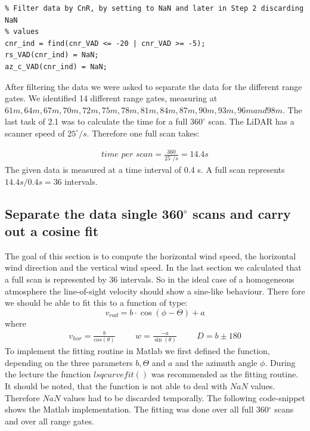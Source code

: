 \documentclass[10pt]{article}
\begin{document}
\begin{lstlisting}
% Filter data by CnR, by setting to NaN and later in Step 2 discarding NaN
% values
cnr_ind = find(cnr_VAD <= -20 | cnr_VAD >= -5);
rs_VAD(cnr_ind) = NaN;
az_c_VAD(cnr_ind) = NaN;
\end{lstlisting}

After filtering the data we were asked to separate the data for the different range gates. We identified 14 different range gates, measuring at $61m, 64m, 67m, 70m, 72m, 75m, 78m, 81m, 84m, 87m, 90m, 93m, 96m and 98m$. 
The last task of 2.1 was to calculate the time for a full $360^\circ$ scan. The LiDAR has a scanner speed of $25^\circ/s$. Therefore one full scan takes:

\begin{align*}
\textit{time per scan} = \frac{360}{25^\circ/s} = 14.4s 
\end{align*}
The given data is measured at a time interval of 0.4 s. A full scan represents $14.4s / 0.4s = 36$ intervals.
\subsection{Separate the data single 360$^\circ$ scans and carry out a cosine fit}
The goal of this section is to compute the horizontal wind speed, the horizontal wind direction and the vertical wind speed. In the last section we calculated that a full scan is represented by 36 intervals. So in the ideal case of a homogeneous atmosphere the line-of-sight velocity should show a sine-like behaviour. There fore we should be able to fit this to a function of type:
\begin{equation*}
v_{rad} =  b \cdot\cos(\phi - \Theta) +a
\end{equation*}
where 
\begin{align*}
v_{hor} = \frac{b}{cos(\theta)} \hspace{1cm} w= \frac{-a}{\sin(\theta)} \hspace{1cm} D= b \pm 180
\end{align*}
To implement the fitting routine in Matlab we first defined the function, depending on the three parameters $b, \Theta$ and $a$ and the azimuth angle $\phi$. During the lecture the function $lsqcurvefit()$ was recommended as the fitting routine. It should be noted, that the function is not able to deal with $NaN$ values. Therefore $NaN$ values had to be discarded temporally.
The following code-snippet shows the Matlab implementation. The fitting was done over all full 360$^\circ$ scans and over all range gates.
\end{document}

